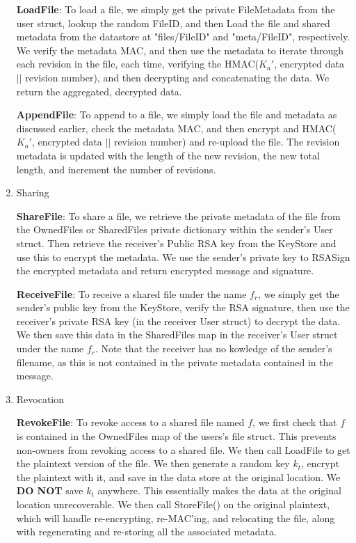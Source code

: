 \documentclass[11pt]{article}
\begin{document}
\begin{enumerate}
\textbf{LoadFile}: To load a file, we simply get the private FileMetadata from the user struct, lookup the random FileID, and then Load the file and shared metadata from the datastore at "files/FileID" and "meta/FileID", respectively. We verify the metadata MAC, and then use the metadata to iterate through each revision in the file, each time, verifying the HMAC($K_a'$, encrypted data $||$ revision number), and then decrypting and concatenating the data. We return the aggregated, decrypted data.

\textbf{AppendFile}: To append to a file, we simply load the file and metadata as discussed earlier, check the metadata MAC, and then encrypt and HMAC($K_a'$, encrypted data $||$ revision number) and re-upload the file. The revision metadata is updated with the length of the new revision, the new total length, and increment the number of revisions.

\item{Sharing}

\textbf{ShareFile}: To share a file, we retrieve the private metadata of the file from the OwnedFiles or SharedFiles private dictionary within the sender's User struct. Then retrieve the receiver's Public RSA key from the KeyStore and use this to encrypt the metadata. We use the sender's private key to RSASign the encrypted metadata and return encrypted message and signature.

\textbf{ReceiveFile}: To receive a shared file under the name $f_r$, we simply get the sender's public key from the KeyStore, verify the RSA signature, then use the receiver's private RSA key (in the receiver User struct) to decrypt the data. We then save this data in the SharedFiles map in the receiver's User struct under the name $f_r$. Note that the receiver has no kowledge of the sender's filename, as this is not contained in the private metadata contained in the message.

\item{Revocation}

\textbf{RevokeFile}: To revoke access to a shared file named $f$, we first check that $f$ is contained in the OwnedFiles map of the users's file struct. This prevents non-owners from revoking access to a shared file. We then call LoadFile to get the plaintext version of the file. We then generate a random key $k_t$, encrypt the plaintext with it, and save in the data store at the original location. We \textbf{DO NOT} save $k_t$ anywhere. This essentially makes the data at the original location unrecoverable. We then call StoreFile() on the original plaintext, which will handle re-encrypting, re-MAC'ing, and relocating the file, along with regenerating and re-storing all the associated metadata.

\end{enumerate}
\end{document}
